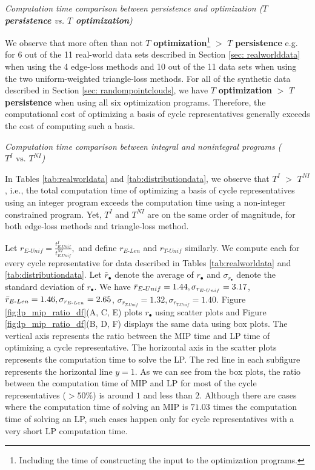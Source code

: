 \documentclass[utf8]{formatting_stuff/frontiersFPHY}
\newcommand{\se}{Section }
\newcommand{\fig}{Figure }
\newcommand{\NI}{^{NI}}
\newcommand{\I}{^I}
\newcommand{\EU}{_{E\text{-}Unif}}
\newcommand{\EL}{_{E\text{-}Len}}
\newcommand{\TU}{_{T\text{-}Unif}}
\theoremstyle{plain}
\theoremstyle{definition}
\begin{document}
 

\emph{Computation time comparison between persistence and optimization (\textbf{$T$ persistence} vs. \textbf{$T$ optimization})}

We observe that more often than not $T$ \textbf{optimization}\footnote{Including the time of constructing the input to the optimization programs.} $>$ $T$ \textbf{persistence} e.g. for 6 out of the 11 real-world data sets described in \se \ref{sec: realworlddata} when using the 4 edge-loss methods and 10 out of the 11 data sets when using the two uniform-weighted triangle-loss methods. For all of the synthetic data described in \se \ref{sec: randompointclouds}, we have $T$ \textbf{optimization} $>$ $T$ \textbf{persistence} when using all six optimization programs. 
Therefore, the computational cost of optimizing a basis of cycle representatives generally exceeds the cost of computing such a basis.

\emph{Computation time comparison between integral and nonintegral programs ($T^I \text{ vs. } T^{NI}$)} 

In Tables \ref{tab:realworldata} and \ref{tab:distributiondata}, we observe that $T^I$ $>$ $T^{NI}$, i.e., the total computation time of optimizing a basis of cycle representatives using an integer program exceeds the computation time using a non-integer constrained program. Yet, $T^I$ and $T^{NI}$ are on the same order of magnitude, for both edge-loss methods and triangle-loss method.  


Let $r\EU = \frac{t\I\EU}{t\NI\EU},$ and define $r\EL$ and $r\TU$ similarly. We compute each for every cycle representative for data described in Tables \ref{tab:realworldata} and \ref{tab:distributiondata}. Let $\bar{r}_\bullet$ denote the average of $r_\bullet$ and $\sigma_{r_\bullet}$ denote the standard deviation of $r_\bullet$. We have $\Bar{r}\EU = 1.44 , \sigma_{r\EU} = 3.17$, $\Bar{r}\EL = 1.46,  \sigma_{r\EL} = 2.65$, $ \sigma_{r\TU} = 1.32, \sigma_{r\TU} = 1.40$. \fig \ref{fig:lp_mip_ratio_df}(A, C, E) plots $r_\bullet$ using scatter plots and \fig \ref{fig:lp_mip_ratio_df}(B, D, F) displays the same data using box plots. The vertical axis represents the ratio between the MIP time and LP time of optimizing a cycle representative. The horizontal axis in the scatter plots represents the computation time to solve the LP. The red line in each subfigure represents the horizontal line $y=1$. As we can see from the box plots, the ratio between the computation time of MIP and LP for most of the cycle representatives ($>50\%$) is around $1$ and less than $2$. Although there are cases where the computation time of solving an MIP is $71.03$ times the computation time of solving an LP, such cases happen only for cycle representatives with a very short LP computation time.  
\end{document}
